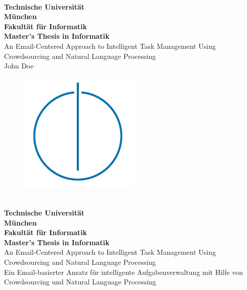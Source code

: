 \documentclass[12pt,oneside, draft]{report}
\begin{document}
\nocite{*} %
\hoffset=5mm
\thispagestyle{empty}

\begin{center}
	\bigskip \bigskip \bigskip 
	\oTUM{6.0cm} \\
	\vspace*{0.8cm}
	{\huge \bf Technische Universität} \\
	\bigskip
	{\huge \bf München} \\
	\bigskip \bigskip \bigskip
	{\huge \bf Fakultät für Informatik} \\
	\bigskip \bigskip \bigskip
	{\Large \bf Master's Thesis in Informatik} \\
	\bigskip \bigskip \bigskip \bigskip \bigskip
	{\Large An Email-Centered Approach to Intelligent Task Management Using Crowdsourcing and Natural Language Processing} \\        
	\bigskip \bigskip \bigskip \bigskip
	{\Large John Doe} \\    
	\bigskip
	\begin{figure}[ht]
	\centering \includegraphics[width=0.2\linewidth]{figures/infologo.jpg}
	\end{figure}
	\bigskip 
\end{center}

\vfill

\newpage
\hoffset=5mm
\thispagestyle{empty}

\begin{center}
	\bigskip \bigskip \bigskip 
	\oTUM{6.0cm} \\
	\vspace*{0.8cm}
	{\huge \bf Technische Universität} \\
	\bigskip
	{\huge \bf München} \\
	\bigskip \bigskip \bigskip
	{\huge \bf Fakultät für Informatik} \\
	\bigskip \bigskip \bigskip
	{\Large \bf Master's Thesis in Informatik} \\
	\bigskip \bigskip \bigskip \bigskip \bigskip
	{\Large An Email-Centered Approach to Intelligent Task Management Using Crowdsourcing and Natural Language Processing} \\
	\bigskip \bigskip \bigskip
	{\Large Ein Email-basierter Ansatz für intelligente Aufgabenverwaltung mit Hilfe von Crowdsourcing und Natural Language Processing} \\
	\bigskip
\end{center}
\vfill
\end{document}
